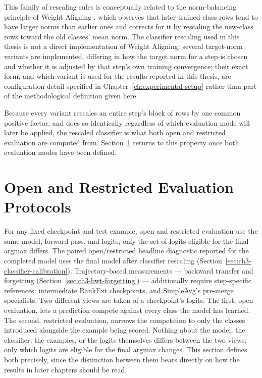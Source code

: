 This family of rescaling rules is conceptually related to the norm-balancing
principle of Weight Aligning \parencite{zhao2020maintaining}, which observes
that later-trained class rows tend to have larger norms than earlier ones
and corrects for it by rescaling the new-class rows toward the old classes'
mean norm. The classifier rescaling used in this thesis is not a direct
implementation of Weight Aligning: several target-norm variants are
implemented, differing in how the target norm for a step is chosen and
whether it is adjusted by that step's own training convergence; their exact
form, and which variant is used for the results reported in this thesis,
are configuration detail specified in Chapter~\ref{ch:experimental-setup}
rather than part of the methodological definition given here.

Because every variant rescales an entire step's block of rows by one
common positive factor, and does so identically regardless of which
evaluation mode will later be applied, the rescaled classifier is what
both open and restricted evaluation are computed from. Section~\ref{sec:ch3-open-restricted}
returns to this property once both evaluation modes have been defined.

\section{Open and Restricted Evaluation Protocols}
\label{sec:ch3-open-restricted}

For any fixed checkpoint and test example, open and restricted evaluation
use the same model, forward pass, and logits; only the set of logits
eligible for the final argmax differs. The paired open/restricted headline
diagnostic reported for the completed model uses the final model after classifier rescaling
(Section~\ref{sec:ch3-classifier-calibration}). Trajectory-based
measurements --- backward transfer and forgetting
(Section~\ref{sec:ch3-bwt-forgetting}) --- additionally require
step-specific references: intermediate RankExt checkpoints, and
SimpleAvg's pre-merge specialists. Two different views are taken of a
checkpoint's logits. The first, open evaluation, lets a prediction
compete against every class the model has learned. The second, restricted
evaluation, narrows the competition to only the classes introduced
alongside the example being scored. Nothing about the model, the
classifier, the examples, or the logits themselves differs between the two
views; only which logits are eligible for the final argmax changes. This
section defines both precisely, since the distinction between them bears
directly on how the results in later chapters should be read.

